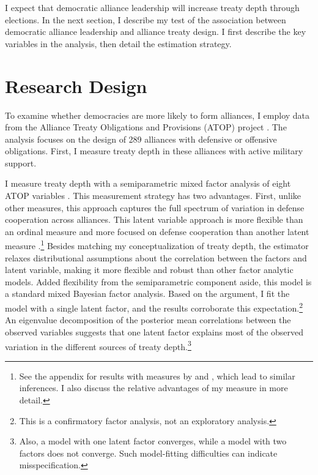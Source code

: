 \documentclass[12pt]{article}
\begin{document}
I expect that democratic alliance leadership will increase treaty depth through elections. 
In the next section, I describe my test of the association between democratic alliance leadership and alliance treaty design. 
I first describe the key variables in the analysis, then detail the estimation strategy.



\section{Research Design}



To examine whether democracies are more likely to form alliances, I employ data from the Alliance Treaty Obligations and Provisions (ATOP) project \citep{Leedsetal2002}. 
The analysis focuses on the design of 289 alliances with defensive or offensive obligations.
First, I measure treaty depth in these alliances with active military support. 


I measure treaty depth with a semiparametric mixed factor analysis of eight ATOP variables \citep{Murrayetal2013}.
This measurement strategy has two advantages. 
First, unlike other measures, this approach captures the full spectrum of variation in defense cooperation across alliances.
This latent variable approach is more flexible than an ordinal measure \citep{LeedsAnac2005} and more focused on defense cooperation than another latent measure \citep{BensonClinton2016}.\footnote{See the appendix for results with measures by \citet{LeedsAnac2005} and \citet{BensonClinton2016}, which lead to similar inferences. I also discuss the relative advantages of my measure in more detail.}
Besides matching my conceptualization of treaty depth, the estimator relaxes distributional assumptions about the correlation between the factors and latent variable, making it more flexible and robust than other factor analytic models. 
Added flexibility from the semiparametric component aside, this model is a standard mixed Bayesian factor analysis. 
Based on the argument, I fit the model with a single latent factor, and the results corroborate this expectation.\footnote{This is a confirmatory factor analysis, not an exploratory analysis.}
An eigenvalue decomposition of the posterior mean correlations between the observed variables suggests that one latent factor explains most of the observed variation in the different sources of treaty depth.\footnote{Also, a model with one latent factor converges, while a model with two factors does not converge. Such model-fitting difficulties can indicate misspecification.} 
\end{document}

